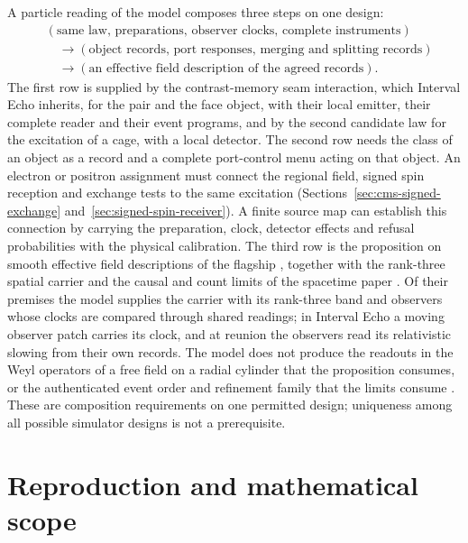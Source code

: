 \documentclass[11pt]{article}
\begin{document}
A particle reading of the model composes three steps on one design:
\[
\begin{split}
 &(\text{same law, preparations, observer clocks, complete instruments})\\
 &\quad\longrightarrow
 (\text{object records, port responses, merging and splitting records})\\
 &\quad\longrightarrow
 (\text{an effective field description of the agreed records}).
\end{split}
\]
The first row is supplied by the contrast-memory seam interaction, which Interval Echo
inherits, for the pair and the face object, with their local emitter, their complete reader
and their event programs, and by the second candidate law for the excitation of a cage,
with a local detector. The second row needs the class of an object as a record
and a complete port-control menu acting on that object.
An electron or positron assignment must connect the regional field,
signed spin reception and exchange tests to the same excitation
(Sections~\ref{sec:cms-signed-exchange} and~\ref{sec:signed-spin-receiver}).
A finite source map can establish this connection by carrying the
preparation, clock, detector effects and refusal probabilities with
the physical calibration. The third
row is the proposition on smooth effective field descriptions of the flagship
\cite{flagship}, together with the rank-three spatial carrier and the causal and count
limits of the spacetime paper \cite{ophEinstein}. Of their premises the model supplies the
carrier with its rank-three band and observers whose clocks are compared through shared
readings; in Interval Echo a moving observer patch carries its clock, and at reunion the
observers read its relativistic slowing from their own records. The model does not produce
the readouts in the Weyl operators of
a free field on a radial cylinder that the proposition consumes, or the authenticated event
order and refinement family that the limits consume \cite{ophmodel}. These are composition
requirements on one permitted design; uniqueness among all possible simulator designs is
not a prerequisite.

\section*{Reproduction and mathematical scope}
\end{document}
